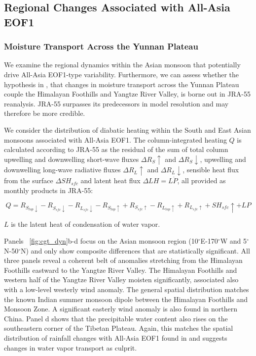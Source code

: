 \subsection{Regional Changes Associated with All-Asia EOF1}

\subsubsection{Moisture Transport Across the Yunnan Plateau}

	We examine the regional dynamics within the Asian monsoon that potentially drive All-Asia EOF1-type variability. Furthermore, we can assess whether the hypothesis in \citet{Day2015}, that changes in moisture transport across the Yunnan Plateau couple the Himalayan Foothills and Yangtze River Valley, is borne out in JRA-55 reanalysis. JRA-55 surpasses its predecessors in model resolution and may therefore be more credible.
	
	We consider the distribution of diabatic heating within the South and East Asian monsoons associated with All-Asia EOF1. The column-integrated heating $Q$ is calculated according to JRA-55 as the residual of the sum of total column upwelling and downwelling short-wave fluxes $\Delta R_S\uparrow$ and $\Delta R_S\downarrow$, upwelling and downwelling long-wave radiative fluxes $\Delta R_L\uparrow$ and $\Delta R_L\downarrow$, sensible heat flux from the surface  $\Delta SH_{sfc}$ and latent heat flux  $\Delta LH=L \dot P$, all provided as monthly products in JRA-55:
	
\begin{equation}
	Q=R_{S_{top}\downarrow}-R_{S_{sfc}\downarrow}-R_{L_{sfc}\downarrow}-R_{S_{top}\uparrow}+R_{S_{sfc}\uparrow}-R_{L_{top}\uparrow}+R_{L_{sfc}\uparrow}+SH_{sfc}\uparrow+LP
\end{equation}
	
	$L$ is the latent heat of condensation of water vapor.
	
	Panels ~\ref{fig:cgt_dyn}b-d focus on the Asian monsoon region (10$^{\circ}$E-170$^{\circ}$W and 5$^{\circ}$N-50$^{\circ}$N) and only show composite differences that are statistically significant. All three panels reveal a coherent belt of anomalies stretching from the Himalayan Foothills eastward to the Yangtze River Valley. The Himalayan Foothills and western half of the Yangtze River Valley moisten significantly, associated also with a low-level westerly wind anomaly. The general spatial distribution matches the known Indian summer monsoon dipole between the Himalayan Foothills and Monsoon Zone. A significant easterly wind anomaly is also found in northern China. Panel d shows that the precipitable water content also rises on the southeastern corner of the Tibetan Plateau. Again, this matches the spatial distribution of rainfall changes with All-Asia EOF1 found in \citet{Day2015} and suggests changes in water vapor transport as culprit.
	
